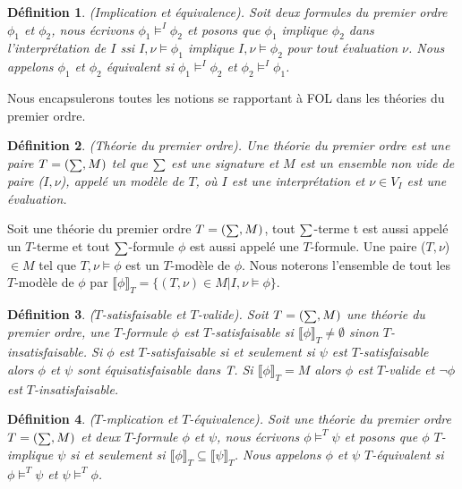 \documentclass[9pt]{book}
\newcommand\phibra{\llbracket\phi\rrbracket}
\newcommand\psibra{\llbracket\psi\rrbracket}
\newtheorem{definition}{D\'efinition}[section]
\begin{document}
\begin{definition}
(Implication et \'equivalence). Soit deux formules du premier ordre $\phi_{1}$ et $\phi_{2}$, nous \'ecrivons $\phi_{1}\models^{I}\phi_{2}$ et posons que $\phi_{1}$ implique $\phi_{2}$ dans l'interpr\'etation de $I$ ssi $I,\nu\models\phi_{1}$ implique $I,\nu\models\phi_{2}$ pour tout \'evaluation $\nu$. Nous appelons $\phi_{1}$  et $\phi_{2}$  \'equivalent si $\phi_{1}\models^{I}\phi_{2}$ et $\phi_{2}\models^{I}\phi_{1}$.
\end{definition}\par
Nous encapsulerons toutes les notions se rapportant \`a FOL dans les th\'eories du premier ordre.

\begin{definition}
(Th\'eorie du premier ordre). Une th\'eorie du premier ordre est une paire $T=(\mathsmaller \sum,M)$ tel que $\mathsmaller \sum$ est une signature et $M$ est un ensemble non vide de paire ($I,\nu$), appel\'e un mod\`ele de $T$, o\`u $I$ est une interpr\'etation et $\nu\in V_{I}$ est une \'evaluation.
\end{definition}

Soit une th\'eorie du premier ordre $T = (\mathsmaller \sum,M)$, tout $\mathsmaller \sum$-terme t est aussi appel\'e un $T$-terme et tout $\mathsmaller \sum$-formule $\phi$ est aussi appel\'e une $T$-formule. Une paire ($T,\nu$)$\in M$ tel que $T,\nu\models\phi$ est un $T$-mod\`ele de $\phi$. Nous noterons l'ensemble de tout les $T$-mod\`ele de $\phi$ par $\phibra_{T} = \{(T,\nu)\in M | I,\nu\models\phi\}$.

\begin{definition}
($T$-satisfaisable et $T$-valide). Soit $T = (\mathsmaller\sum,M)$ une th\'eorie du premier ordre, une $T$-formule $\phi$ est $T$-satisfaisable si $\phibra_{T} \neq \emptyset$ sinon $T$-insatisfaisable. Si $\phi$ est $T$-satisfaisable si et seulement si $\psi$ est $T$-satisfaisable alors $\phi$ et $\psi$ sont \'equisatisfaisable dans T. Si $\phibra_{T} = M$ alors $\phi$ est $T$-valide et $\neg\phi$ est $T$-insatisfaisable.
\end{definition}

\begin{definition}
($T$-mplication et $T$-\'equivalence). Soit une th\'eorie du premier ordre $T = (\mathsmaller \sum,M)$ et deux $T$-formule $\phi$ et $\psi$, nous \'ecrivons $\phi\models^{T}\psi$ et posons que $\phi$ $T$-implique $\psi$ si et seulement si $\phibra_{T}\subseteq \psibra_{T}$. Nous appelons $\phi$  et $\psi$  $T$-\'equivalent si $\phi\models^{T}\psi$ et $\psi\models^{T}\phi$.
\end{definition}\par
\end{document}
